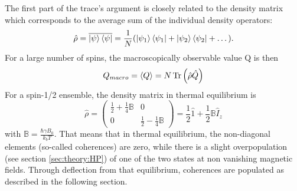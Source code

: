             The first part of the trace's argument is closely related to the density matrix which corresponds to the average sum of the individual density operators:
            \begin{equation}
                \hat\rho = \overline{\ket\psi\bra\psi} = \frac{1}{N} (\ket{\psi_1}\bra{\psi_1} + \ket{\psi_2}\bra{\psi_2} + \dots).
            \end{equation}
            For a large number of spins, the macroscopically observable value Q is then
            \begin{equation}
                Q_{macro} = \left< Q \right> = N \operatorname{Tr} \left( \hat{\rho} \hat{Q}\right)
            \end{equation}
            For a spin-1/2 ensemble, the density matrix in thermal equilibrium is
            \begin{equation}
                \hat \rho = \begin{pmatrix} \frac{1}{2}+\frac{1}{4}\mathbb{B}& 0\\ 0&
                \frac{1}{2}-\frac{1}{4}\mathbb{B}\end{pmatrix} = \frac {1}{2} \hat1 + \frac{1}{2} \mathbb{B}
                \hat I_z
            \end{equation}
            with $\mathbb{B} = \frac{\hbar\gamma B_0}{k_b T}$. That means that in thermal equilibrium, the non-diagonal elements (so-called coherences) are zero, while there is a slight overpopulation (see section \ref{sec:theory:HP}) of one of the two states at non vanishing magnetic fields. Through deflection from that equilibrium, coherences are populated as described in the following section.
